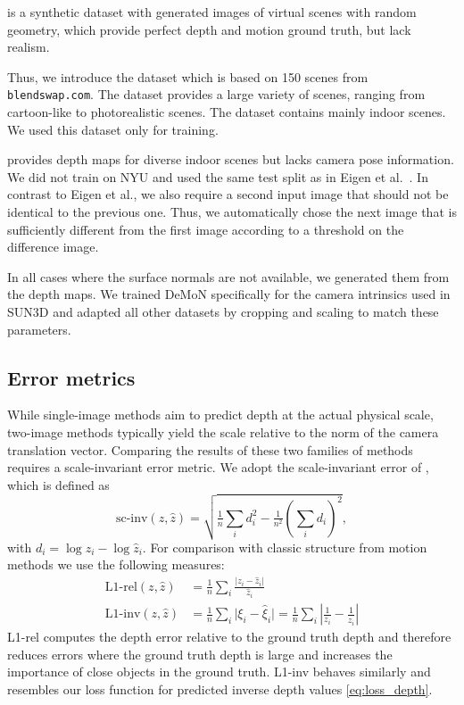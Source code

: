 \documentclass[10pt,twocolumn,letterpaper]{article}
\begin{document}
 is a synthetic dataset with generated images of virtual scenes with random geometry, which provide perfect depth and motion ground truth, but lack realism. 

Thus, we introduce the  dataset which is based on 150 scenes from \texttt{blendswap.com}.
The dataset provides a large variety of scenes, ranging from cartoon-like to photorealistic scenes.
The dataset contains mainly indoor scenes. We used this dataset only for training. 

 \cite{NYU} provides depth maps for diverse indoor scenes but lacks camera pose information.
We did not train on NYU and used the same test split as in Eigen et al.~\cite{eigen_predicting_2015}.
In contrast to Eigen et al., we also require a second input image that should not be identical to the previous one. Thus, we automatically chose the next image that is sufficiently different from the first image according to a threshold on the difference image.

In all cases where the surface normals are not available, we generated them from the depth maps.
We trained DeMoN specifically for the camera intrinsics used in SUN3D and adapted all other datasets by cropping and scaling to match these parameters.

\subsection{Error metrics}
While single-image methods aim to predict depth at the actual physical scale, two-image methods typically yield the scale relative to the norm of the camera translation vector.
Comparing the results of these two families of methods requires a scale-invariant error metric.
We adopt the scale-invariant error of \cite{eigen_predicting_2014}, which is defined as
\begin{equation}
\textstyle \text{sc-inv}(z,\hat{z}) = \sqrt{\tfrac{1}{n}\sum_i d_i^2 - \tfrac{1}{n^2} \left(\sum_i d_i\right)^2},
\end{equation}
with $ d_i = \log z_i - \log \hat{z}_i$.
For comparison with classic structure from motion methods we use the following measures:
\begin{align}
\text{L1-rel}(z,\hat{z}) &= \tfrac{1}{n} \textstyle{\sum_i} \frac{\vert z_i - \hat{z}_i\vert}{\hat{z}_i}\\
\text{L1-inv}(z,\hat{z}) &= \tfrac{1}{n} \textstyle{\sum_i} \vert \xi_i - \hat{\xi}_i\vert = \tfrac{1}{n} \textstyle{\sum_i} \left\vert \frac{1}{z_i} - \frac{1}{\hat{z}_i}\right\vert 
\end{align}
L1-rel computes the depth error relative to the ground truth depth and therefore reduces errors where the ground truth depth is large and increases the importance of close objects in the ground truth.
L1-inv behaves similarly and resembles our loss function for predicted inverse depth values \eqref{eq:loss_depth}.
\end{document}
